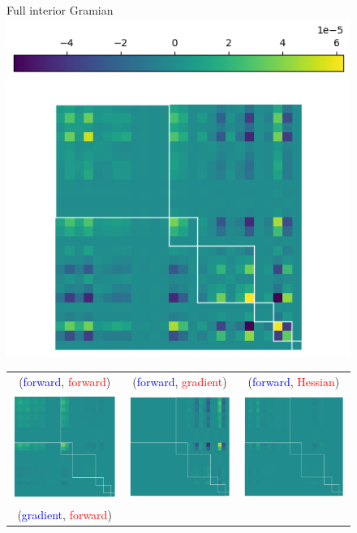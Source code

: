 \begin{figure}[t]
  \centering
  Full interior Gramian\\
  \includegraphics[width=0.43\linewidth]{kfac_pinns_exp/exp04_gramian_contributions/fig/gram_full.png}

  \begin{tabular}{ccc}
    (\textcolor{blue}{forward}, \textcolor{red}{forward})
    &
      (\textcolor{blue}{forward}, \textcolor{red}{gradient})
    &
      (\textcolor{blue}{forward}, \textcolor{red}{Hessian})
    \\
    \includegraphics[width=0.22\linewidth]{kfac_pinns_exp/exp04_gramian_contributions/fig/gram_output_output.png}
    &
      \includegraphics[width=0.22\linewidth]{kfac_pinns_exp/exp04_gramian_contributions/fig/gram_output_grad_input.png}
    &
      \includegraphics[width=0.22\linewidth]{kfac_pinns_exp/exp04_gramian_contributions/fig/gram_output_hess_input.png}
    \\
    (\textcolor{blue}{gradient}, \textcolor{red}{forward})

\end{tabular}
\end{figure}
